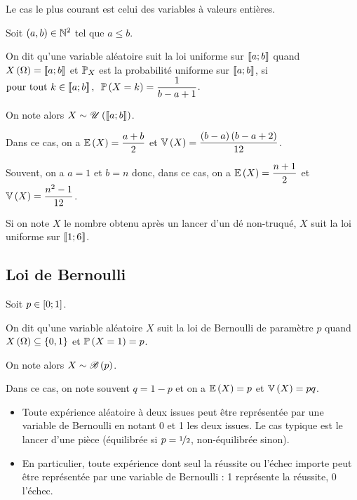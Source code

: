 Le cas le plus courant est celui des variables à valeurs entières.

\begin{defi}
Soit \(\left(a,b\right)\in\mathbb{N}^2\) tel que \(a\leq b\).

On dit qu'une variable aléatoire suit la loi uniforme sur \(\left\llbracket a;b\right\rrbracket\) quand \(X\left(\Omega\right)=\left\llbracket a;b\right\rrbracket\) et \(\mathbb{P}_X\) est la probabilité uniforme sur \(\left\llbracket a;b\right\rrbracket\), \ie si \(\quantifs{\tpt k\in\interventierii{a}{b}}\proba{X=k}=\dfrac{1}{b-a+1}\).

On note alors \(X\sim\mathscr{U}\left(\left\llbracket a;b\right\rrbracket\right)\).
\end{defi}

Dans ce cas, on a \(\operatorname{\mathbb{E}}\left(X\right)=\dfrac{a+b}{2}\) et \(\operatorname{\mathbb{V}}\left(X\right)=\dfrac{\left(b-a\right)\left(b-a+2\right)}{12}\).

Souvent, on a \(a=1\) et \(b=n\) donc, dans ce cas, on a \(\operatorname{\mathbb{E}}\left(X\right)=\dfrac{n+1}{2}\) et \(\operatorname{\mathbb{V}}\left(X\right)=\dfrac{n^2-1}{12}\).

\begin{ex}
Si on note \(X\) le nombre obtenu après un lancer d'un dé non-truqué, \(X\) suit la loi uniforme sur \(\left\llbracket1;6\right\rrbracket\).
\end{ex}

\subsection{Loi de Bernoulli}

\begin{defi}
Soit \(p\in\left[0;1\right]\).

On dit qu'une variable aléatoire \(X\) suit la loi de Bernoulli de paramètre \(p\) quand \(X\left(\Omega\right)\subseteq\left\lbrace0,1\right\rbrace\) et \(\mathbb{P}\left(X=1\right)=p\).

On note alors \(X\sim\mathscr{B}\left(p\right)\).
\end{defi}

Dans ce cas, on note souvent \(q=1-p\) et on a \(\operatorname{\mathbb{E}}\left(X\right)=p\) et \(\operatorname{\mathbb{V}}\left(X\right)=pq\).

\begin{ex}
\begin{itemize}
    \item Toute expérience aléatoire à deux issues peut être représentée par une variable de Bernoulli en notant 0 et 1 les deux issues. Le cas typique est le lancer d'une pièce (équilibrée si \(p=\nicefrac{1}{2}\), non-équilibrée sinon). \\
    \item En particulier, toute expérience dont seul la réussite ou l'échec importe peut être représentée par une variable de Bernoulli : 1 représente la réussite, 0 l'échec.
\end{itemize}
\end{ex}

